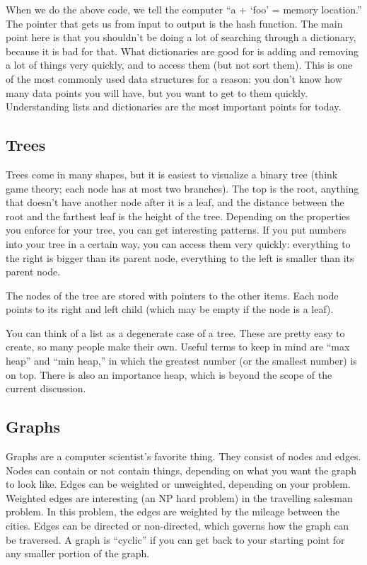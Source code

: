 \documentclass[12pt,letter]{article}
\begin{document}
When we do the above code, we tell the computer ``a + `foo' = memory
location.'' The pointer that gets us from input to output is the hash
function. The main point here is that you shouldn't be doing a lot of
searching through a dictionary, because it is bad for that. What
dictionaries are good for is adding and removing a lot of things very
quickly, and to access them (but not sort them). This is one of the
most commonly used data structures for a reason: you don't know how
many data points you will have, but you want to get to them
quickly. Understanding lists and dictionaries are the most important
points for today. 

\subsection{Trees}

Trees come in many shapes, but it is easiest to visualize a binary
tree (think game theory; each node has at most two branches). The top is the root, anything that doesn't
have another node after it is a leaf, and the distance between the
root and the farthest leaf is the height of the tree. Depending on the
properties you enforce for your tree, you can get interesting
patterns. If you put numbers into your tree in a certain way, you can
access them very quickly: everything to the right is bigger than its
parent node, everything to the left is smaller than its parent node. 

The nodes of the tree are stored with pointers to the other
items. Each node points to its right and left child (which may be
empty if the node is a leaf). 

You can think of a list as a degenerate case of a tree. These are
pretty easy to create, so many people make their own. Useful terms to
keep in mind are ``max heap'' and ``min heap,'' in which the greatest
number (or the smallest number) is on top. There is also an importance
heap, which is beyond the scope of the current discussion.

\subsection{Graphs}

Graphs are a computer scientist's favorite thing. They consist of
nodes and edges. Nodes can contain or not contain things, depending on
what you want the graph to look like. Edges can be weighted or
unweighted, depending on your problem. Weighted edges are interesting
(an NP hard problem) in the travelling salesman problem. In this
problem, the edges are weighted by the mileage between the
cities. Edges can be directed or non-directed, which governs how the
graph can be traversed. A graph is ``cyclic'' if you can get back to
your starting point for any smaller portion of the graph.
\end{document}
